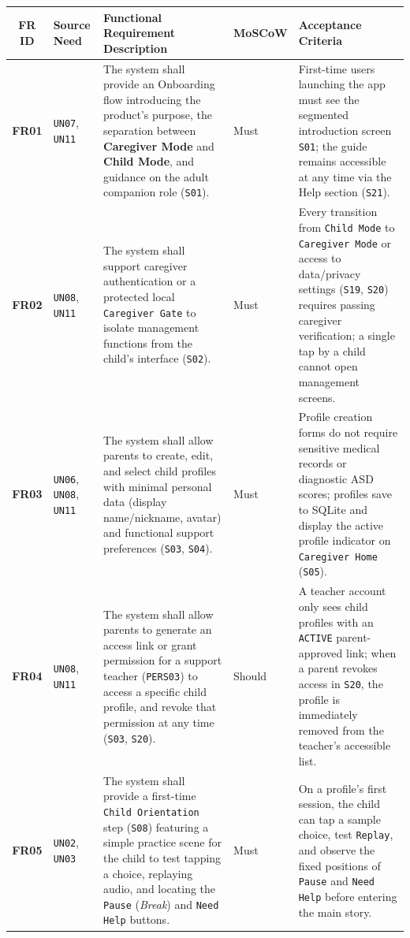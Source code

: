\begin{footnotesize}
\noindent\begin{xltabular}{\textwidth}{|c|p{2.2cm}|X|p{2.0cm}|p{2.4cm}|}
\hline
\textbf{FR ID} & \textbf{Source Need} & \textbf{Functional Requirement Description} & \textbf{MoSCoW} & \textbf{Acceptance Criteria} \\ \hline
\endhead
\textbf{FR01} & \texttt{UN07}, \texttt{UN11} & The system shall provide an Onboarding flow introducing the product's purpose, the separation between \textbf{Caregiver Mode} and \textbf{Child Mode}, and guidance on the adult companion role (\texttt{S01}). & Must & First-time users launching the app must see the segmented introduction screen \texttt{S01}; the guide remains accessible at any time via the Help section (\texttt{S21}). \\ \hline
\textbf{FR02} & \texttt{UN08}, \texttt{UN11} & The system shall support caregiver authentication or a protected local \texttt{Caregiver Gate} to isolate management functions from the child's interface (\texttt{S02}). & Must & Every transition from \texttt{Child Mode} to \texttt{Caregiver Mode} or access to data/privacy settings (\texttt{S19}, \texttt{S20}) requires passing caregiver verification; a single tap by a child cannot open management screens. \\ \hline
\textbf{FR03} & \texttt{UN06}, \texttt{UN08}, \texttt{UN11} & The system shall allow parents to create, edit, and select child profiles with minimal personal data (display name/nickname, avatar) and functional support preferences (\texttt{S03}, \texttt{S04}). & Must & Profile creation forms do not require sensitive medical records or diagnostic ASD scores; profiles save to SQLite and display the active profile indicator on \texttt{Caregiver Home} (\texttt{S05}). \\ \hline
\textbf{FR04} & \texttt{UN08}, \texttt{UN11} & The system shall allow parents to generate an access link or grant permission for a support teacher (\texttt{PERS03}) to access a specific child profile, and revoke that permission at any time (\texttt{S03}, \texttt{S20}). & Should & A teacher account only sees child profiles with an \texttt{ACTIVE} parent-approved link; when a parent revokes access in \texttt{S20}, the profile is immediately removed from the teacher's accessible list. \\ \hline
\textbf{FR05} & \texttt{UN02}, \texttt{UN03} & The system shall provide a first-time \texttt{Child Orientation} step (\texttt{S08}) featuring a simple practice scene for the child to test tapping a choice, replaying audio, and locating the \texttt{Pause} (\textit{Break}) and \texttt{Need Help} buttons. & Must & On a profile's first session, the child can tap a sample choice, test \texttt{Replay}, and observe the fixed positions of \texttt{Pause} and \texttt{Need Help} before entering the main story. \\ \hline
\end{xltabular}
\end{footnotesize}



